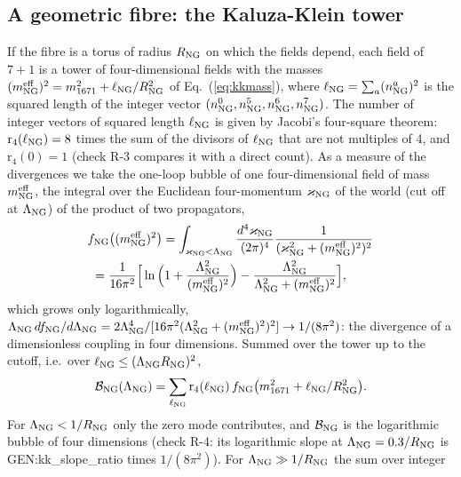 \subsection{A geometric fibre: the Kaluza-Klein tower}

If the fibre is a torus of radius $R_{\rm NG}$ on which the fields depend, each field of $7+1$ is a tower of
four-dimensional fields with the masses $(m^{\rm eff}_{\rm NG})^2=m_{1671}^2+\ell_{\rm NG}/R_{\rm NG}^2$ of
Eq.~(\ref{eq:kkmass}), where $\ell_{\rm NG}=\sum_a(n^a_{\rm NG})^2$ is the squared length of the integer
vector $(n^0_{\rm NG},n^5_{\rm NG},n^6_{\rm NG},n^7_{\rm NG})$. The number of integer vectors of squared length
$\ell_{\rm NG}$ is given by Jacobi's four-square theorem: $\mathrm r_4(\ell_{\rm NG})=8$ times the sum of the
divisors of $\ell_{\rm NG}$ that are not multiples of 4, and $\mathrm r_4(0)=1$ (check R-3 compares it with
a direct count). As a measure of the divergences we take the one-loop bubble of one four-dimensional
field of mass $m^{\rm eff}_{\rm NG}$, the integral over the Euclidean four-momentum $\varkappa_{\rm NG}$ of the
world (cut off at $\Lambda_{\rm NG}$) of the product of two propagators,
\begin{align}
&f_{\rm NG}\big((m^{\rm eff}_{\rm NG})^2\big)=\int_{\varkappa_{\rm NG}<\Lambda_{\rm NG}}\frac{d^4\varkappa_{\rm NG}}{(2\pi)^4}
\frac1{(\varkappa^2_{\rm NG}+(m^{\rm eff}_{\rm NG})^2)^2}\nonumber\\
&\ =\frac1{16\pi^2}\Big[\ln\Big(1+\frac{\Lambda_{\rm NG}^2}
{(m^{\rm eff}_{\rm NG})^2}\Big)-\frac{\Lambda_{\rm NG}^2}{\Lambda_{\rm NG}^2+(m^{\rm eff}_{\rm NG})^2}\Big],
\label{eq:bubble}
\end{align}
which grows only logarithmically, $\Lambda_{\rm NG}\,df_{\rm NG}/d\Lambda_{\rm NG}=2\Lambda_{\rm NG}^4/[16\pi^2
(\Lambda_{\rm NG}^2+(m^{\rm eff}_{\rm NG})^2)^2]\to1/(8\pi^2)$: the divergence of a dimensionless coupling in four
dimensions. Summed over the tower up to the cutoff, i.e.\ over $\ell_{\rm NG}\le(\Lambda_{\rm NG}R_{\rm NG})^2$,
\begin{equation}
\mathcal B_{\rm NG}(\Lambda_{\rm NG})=\sum_{\ell_{\rm NG}}\mathrm r_4(\ell_{\rm NG})\,
f_{\rm NG}\big(m_{1671}^2+\ell_{\rm NG}/R_{\rm NG}^2\big).
\label{eq:tower}
\end{equation}
For $\Lambda_{\rm NG}<1/R_{\rm NG}$ only the zero mode contributes, and $\mathcal B_{\rm NG}$ is the
logarithmic bubble of four dimensions (check R-4: its logarithmic slope at $\Lambda_{\rm NG}=0.3/R_{\rm NG}$
is {{GEN:kk_slope_ratio}} times $1/(8\pi^2)$). For $\Lambda_{\rm NG}\gg1/R_{\rm NG}$ the sum over integer
